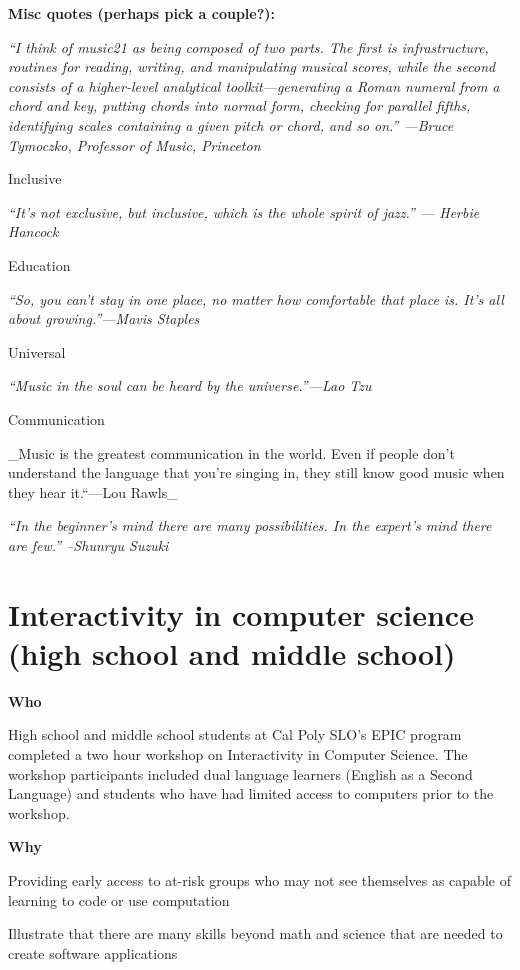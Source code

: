 \documentclass[]{book}
\begin{document}
\textbf{Misc quotes (perhaps pick a couple?):}

\emph{``I think of music21 as being composed of two parts. The first is
infrastructure, routines for reading, writing, and manipulating musical
scores, while the second consists of a higher-level analytical
toolkit---generating a Roman numeral from a chord and key, putting
chords into normal form, checking for parallel fifths, identifying
scales containing a given pitch or chord, and so on.'' ---Bruce
Tymoczko, Professor of Music, Princeton}

Inclusive

\emph{``It's not exclusive, but inclusive, which is the whole spirit of
jazz.'' --- Herbie Hancock}

Education

\emph{``So, you can't stay in one place, no matter how comfortable that
place is. It's all about growing.''---Mavis Staples}

Universal

\emph{``Music in the soul can be heard by the universe.''---Lao Tzu}

Communication

\_Music is the greatest communication in the world. Even if people don't
understand the language that you're singing in, they still know good
music when they hear it.``---Lou Rawls\_

\emph{``In the beginner's mind there are many possibilities. In the
expert's mind there are few.'' --Shunryu Suzuki}

\section{Interactivity in computer science (high school and middle
school)}\label{interactivity-in-computer-science-high-school-and-middle-school}

\textbf{Who}

High school and middle school students at Cal Poly SLO's EPIC program
completed a two hour workshop on Interactivity in Computer Science. The
workshop participants included dual language learners (English as a
Second Language) and students who have had limited access to computers
prior to the workshop.

\textbf{Why}

Providing early access to at-risk groups who may not see themselves as
capable of learning to code or use computation

Illustrate that there are many skills beyond math and science that are
needed to create software applications
\end{document}
